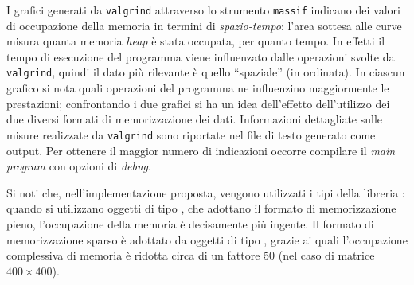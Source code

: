 I grafici generati da \texttt{valgrind} attraverso lo strumento
\texttt{massif} indicano dei valori di occupazione della memoria in
termini di \emph{spazio-tempo}: l'area sottesa alle curve misura
quanta memoria \emph{heap} \`e stata occupata, per quanto tempo. In effetti
il tempo di esecuzione del programma viene influenzato dalle
operazioni svolte da \texttt{valgrind}, quindi il dato pi\`u rilevante
\`e quello ``spaziale'' (in ordinata). In ciascun grafico si nota
quali operazioni del programma ne influenzino maggiormente le
prestazioni; confrontando i due grafici si ha un idea dell'effetto
dell'utilizzo dei due diversi formati di memorizzazione dei
dati. Informazioni dettagliate sulle misure realizzate da
\texttt{valgrind} sono riportate nel file di testo generato come
output. Per ottenere il maggior numero di indicazioni occorre
compilare il \emph{main program} con opzioni di \emph{debug}.

Si noti che, nell'implementazione proposta,
vengono utilizzati i tipi della libreria
: quando si utilizzano oggetti di tipo , che
adottano il formato di memorizzazione pieno, l'occupazione della
memoria \`e decisamente pi\`u ingente. Il formato di memorizzazione sparso \`e adottato da
oggetti di tipo , grazie ai quali l'occupazione complessiva
di memoria \`e ridotta circa di un fattore 50 (nel caso di matrice
$400 \times 400$).


